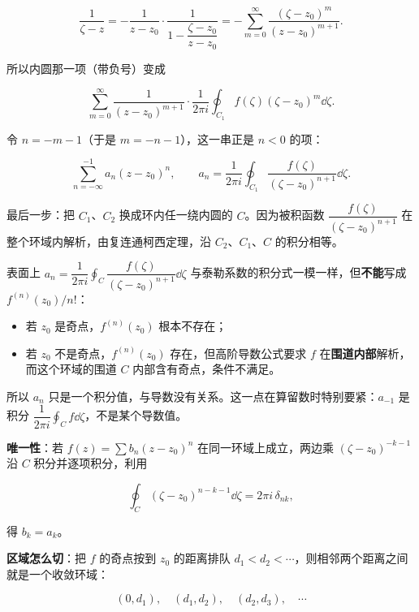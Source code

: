\documentclass[11pt]{ctexart}
\let\origsubhdr\subhdr
\renewcommand{\subhdr}[1]{\par\needspace{4\baselineskip}\origsubhdr{#1}}
\begin{document}
\[ \frac{1}{\zeta-z}=-\frac{1}{z-z_0}\cdot\frac{1}{1-\dfrac{\zeta-z_0}{z-z_0}}=-\sum_{m=0}^{\infty}\frac{(\zeta-z_0)^m}{(z-z_0)^{m+1}} . \]

所以内圆那一项（带负号）变成

\[ \sum_{m=0}^{\infty}\frac{1}{(z-z_0)^{m+1}}\cdot\frac{1}{2\pi i}\oint_{C_1}f(\zeta)(\zeta-z_0)^m\dd\zeta . \]

令 $n=-m-1$（于是 $m=-n-1$），这一串正是 $n<0$ 的项：

\[ \sum_{n=-\infty}^{-1}a_n(z-z_0)^n ,\qquad a_n=\frac{1}{2\pi i}\oint_{C_1}\frac{f(\zeta)}{(\zeta-z_0)^{n+1}}\dd\zeta . \]

最后一步：把 $C_1$、$C_2$ 换成环内任一绕内圆的 $C$。因为被积函数 $\dfrac{f(\zeta)}{(\zeta-z_0)^{n+1}}$ 在整个环域内解析，由复连通柯西定理，沿 $C_2$、$C_1$、$C$ 的积分相等。



表面上 $a_n=\dfrac{1}{2\pi i}\oint_C\dfrac{f(\zeta)}{(\zeta-z_0)^{n+1}}\dd\zeta$ 与泰勒系数的积分式一模一样，但\textbf{不能}写成 $f^{(n)}(z_0)/n!$：

\begin{itemize}
\item 若 $z_0$ 是奇点，$f^{(n)}(z_0)$ 根本不存在；
\item 若 $z_0$ 不是奇点，$f^{(n)}(z_0)$ 存在，但高阶导数公式要求 $f$ 在\textbf{围道内部}解析，而这个环域的围道 $C$ 内部含有奇点，条件不满足。
\end{itemize}

所以 $a_n$ 只是一个积分值，与导数没有关系。这一点在算留数时特别要紧：$a_{-1}$ 是积分 $\dfrac{1}{2\pi i}\oint_Cf\dd\zeta$，不是某个导数值。


\textbf{唯一性}：若 $f(z)=\sum b_n(z-z_0)^n$ 在同一环域上成立，两边乘 $(\zeta-z_0)^{-k-1}$ 沿 $C$ 积分并逐项积分，利用

\[ \oint_C(\zeta-z_0)^{n-k-1}\dd\zeta=2\pi i\,\delta_{nk} , \]

得 $b_k=a_k$。

\textbf{区域怎么切}：把 $f$ 的奇点按到 $z_0$ 的距离排队 $d_1<d_2<\cdots$，则相邻两个距离之间就是一个收敛环域：

\[ (0,d_1),\quad(d_1,d_2),\quad(d_2,d_3),\quad\cdots \]
\end{document}
